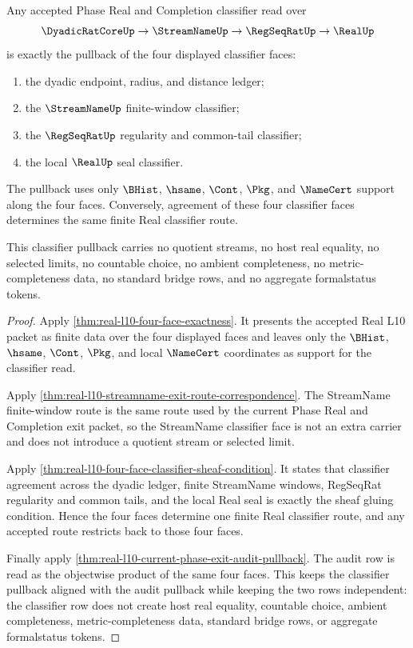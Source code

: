 \begin{theorem}
\label{thm:real-l10-four-face-classifier-pullback}
Any accepted Phase Real and Completion classifier read over
$$
\DyadicRatCoreUp \to \StreamNameUp \to \RegSeqRatUp \to \RealUp
$$
is exactly the pullback of the four displayed classifier faces:
\begin{enumerate}
\item the dyadic endpoint, radius, and distance ledger;
\item the $\StreamNameUp$ finite-window classifier;
\item the $\RegSeqRatUp$ regularity and common-tail classifier;
\item the local $\RealUp$ seal classifier.
\end{enumerate}
The pullback uses only $\BHist$, $\hsame$, $\Cont$, $\Pkg$, and $\NameCert$
support along the four faces. Conversely, agreement of these four classifier
faces determines the same finite Real classifier route.

This classifier pullback carries no quotient streams, no host real equality,
no selected limits, no countable choice, no ambient completeness, no
metric-completeness data, no standard bridge rows, and no aggregate
formalstatus tokens.
\end{theorem}
\begin{proof}
Apply \autoref{thm:real-l10-four-face-exactness}. It presents the accepted
Real L10 packet as finite data over the four displayed faces and leaves only
the $\BHist$, $\hsame$, $\Cont$, $\Pkg$, and local $\NameCert$ coordinates as
support for the classifier read.

Apply \autoref{thm:real-l10-streamname-exit-route-correspondence}. The
StreamName finite-window route is the same route used by the current Phase
Real and Completion exit packet, so the StreamName classifier face is not an
extra carrier and does not introduce a quotient stream or selected limit.

Apply \autoref{thm:real-l10-four-face-classifier-sheaf-condition}. It states
that classifier agreement across the dyadic ledger, finite StreamName windows,
RegSeqRat regularity and common tails, and the local Real seal is exactly the
sheaf gluing condition. Hence the four faces determine one finite Real
classifier route, and any accepted route restricts back to those four faces.

Finally apply \autoref{thm:real-l10-current-phase-exit-audit-pullback}. The
audit row is read as the objectwise product of the same four faces. This keeps
the classifier pullback aligned with the audit pullback while keeping the two
rows independent: the classifier row does not create host real equality,
countable choice, ambient completeness, metric-completeness data, standard
bridge rows, or aggregate formalstatus tokens.
\end{proof}


